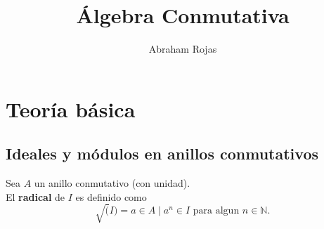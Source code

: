 \documentclass[12pt]{book}
\newtheorem{ex}{Ejercicio}
\begin{document}
\large
\title{Álgebra Conmutativa}	
	\author{Abraham Rojas}
	\date{ }
	
	\maketitle
	\tableofcontents

	

	
	
\part{Teoría básica}	
	
	
\chapter{Ideales y módulos en anillos conmutativos}

Sea $A$ un anillo conmutativo (con unidad).\\
%
%
%
%
%
%
%
%

El \textbf{radical} de $I$ es definido como $$ \sqrt (I) = {a \in A \; | \; a^n \in I \mbox{ para algun }n\in \mathbb{N} } .$$
\end{document}
